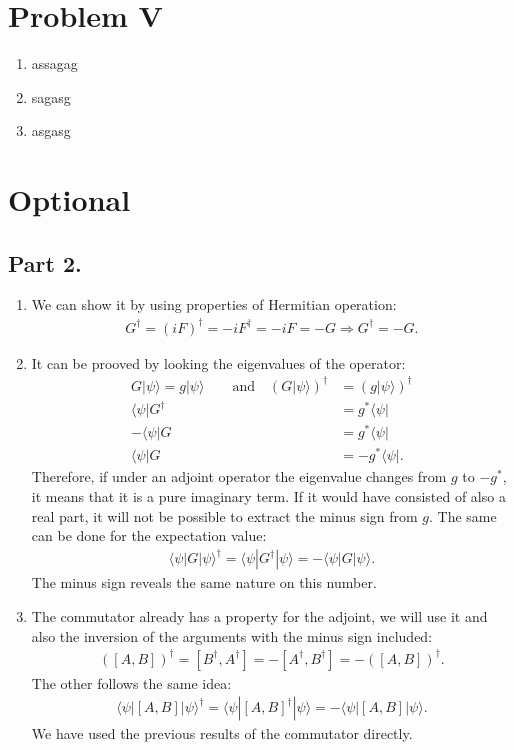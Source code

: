 \documentclass[letterpaper,11pt,twoside]{article}
\newcommand{\ket}[1]{|#1\rangle}
\newcommand{\bra}[1]{\langle#1|}
\newcommand{\braket}[1]{\langle#1\rangle}
\begin{document}
\section*{Problem V}
\begin{enumerate}[itemsep=0pt,topsep=0pt,label=\alph*.]
  \item assagag
  \item sagasg
  \item asgasg
\end{enumerate}



\section*{Optional}
\subsection*{Part 2.}
\begin{enumerate}[itemsep=0pt,topsep=0pt,label=\alph*)]
  \item We can show it by using properties of Hermitian operation:
  \begin{align*}
      G^\dagger=(iF)^\dagger=-iF^\dagger=-iF=-G\Longrightarrow G^\dagger=-G.
  \end{align*}
  \item It can be prooved by looking the eigenvalues of the operator:
  \begin{align*}
    G\ket{\psi}=g\ket{\psi}\qquad\text{and}\quad(G\ket{\psi})^\dagger&=(g\ket{\psi})^\dagger\\
    \bra{\psi}G^\dagger&=g^*\bra{\psi}\\
    -\bra{\psi}G&=g^*\bra{\psi}\\
    \bra{\psi}G&=-g^*\bra{\psi}.
  \end{align*}
  Therefore, if under an adjoint operator the eigenvalue changes from $g$ to $-g^*$, it means that it is a pure imaginary term. If it would have consisted of also a real part,
  it will not be possible to extract the minus sign from $g$. The same can be done for the expectation value:
  \begin{align*}
    \braket{\psi|G|\psi}^\dagger=\braket{\psi|G^\dagger|\psi}=-\braket{\psi|G|\psi}.
  \end{align*}
  The minus sign reveals the same nature on this number.
  \item The commutator already has a property for the adjoint, we will use it and also the inversion of the arguments with the minus sign included:
  \begin{align*}
    ([A,B])^\dagger=[B^\dagger,A^\dagger]=-[A^\dagger,B^\dagger]=-([A,B])^\dagger.
  \end{align*}
  The other follows the same idea:
  \begin{align*}
    \braket{\psi|[A,B]|\psi}^\dagger=\braket{\psi|[A,B]^\dagger|\psi}=-\braket{\psi|[A,B]|\psi}.
  \end{align*}
  We have used the previous results of the commutator directly.
\end{enumerate}

%
\end{document}

